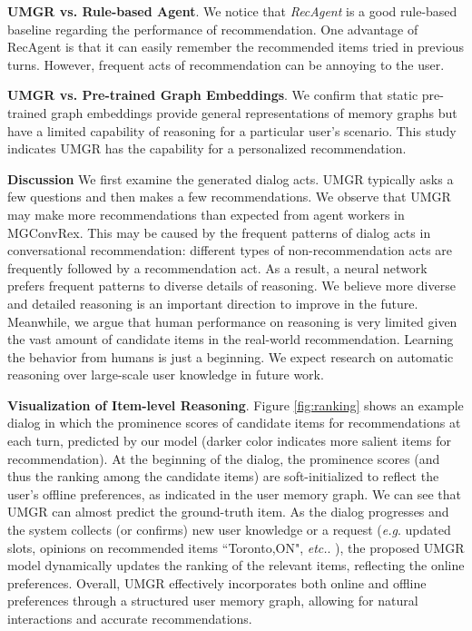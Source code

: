 \documentclass[11pt,a4paper]{article}
\makeatletter
\DeclareRobustCommand\onedot{\futurelet\@let@token\@onedot}
\def\onedot{. }
\def\eg{\emph{e.g}\onedot} \def\Eg{\emph{E.g}\onedot}
\def\etc{\emph{etc.}\onedot} \def\vs{\emph{vs}\onedot}
\makeatother
\begin{document}
\noindent \textbf{UMGR vs. Rule-based Agent}. We notice that \textit{RecAgent} is a good rule-based baseline regarding the performance of recommendation. One advantage of RecAgent is that it can easily remember the recommended items tried in previous turns. However, frequent acts of recommendation can be annoying to the user.

\noindent \textbf{UMGR vs. Pre-trained Graph Embeddings}. We confirm that static pre-trained graph embeddings provide general representations of memory graphs but have a limited capability of reasoning for a particular user's scenario. This study indicates UMGR has the capability for a personalized recommendation.

\noindent \textbf{Discussion} 
We first examine the generated dialog acts. 
UMGR typically asks a few questions and then makes a few recommendations. 
We observe that UMGR may make more recommendations than expected from agent workers in MGConvRex.
This may be caused by the frequent patterns of dialog acts in conversational recommendation: different types of non-recommendation acts are frequently followed by a recommendation act.
As a result, a neural network prefers frequent patterns to diverse details of reasoning.
We believe more diverse and detailed reasoning is an important direction to improve in the future.
Meanwhile, we argue that human performance on reasoning is very limited given the vast amount of candidate items in the real-world recommendation.
Learning the behavior from humans is just a beginning. We expect research on automatic reasoning over large-scale user knowledge in future work.

\noindent \textbf{Visualization of Item-level Reasoning}.
Figure \ref{fig:ranking} shows an example dialog in which the prominence scores of candidate items for recommendations at each turn, predicted by our model (darker color indicates more salient items for recommendation).
At the beginning of the dialog, the prominence scores (and thus the ranking among the candidate items) are soft-initialized to reflect the user's offline preferences, as indicated in the user memory graph. 
We can see that UMGR can almost predict the ground-truth item. 
As the dialog progresses and the system collects (or confirms) new user knowledge or a request (\eg updated slots, opinions on recommended items ``Toronto,ON", \etc), the proposed UMGR model dynamically updates the ranking of the relevant items, reflecting the online preferences.
Overall, UMGR effectively incorporates both online and offline preferences through a structured user memory graph, allowing for natural interactions and accurate recommendations.
\end{document}
